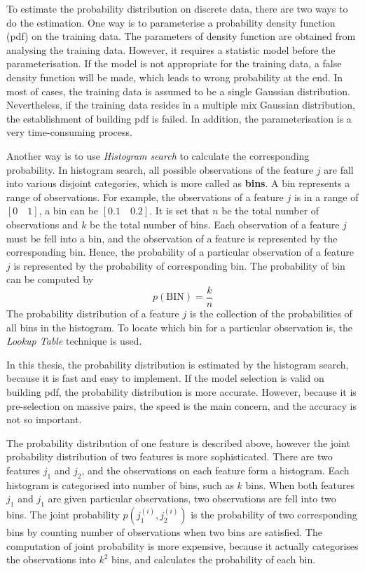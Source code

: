 To estimate the probability distribution on discrete data, there are two ways to do the estimation. One way is to parameterise a probability density function (pdf) on the training data. The parameters of density function are obtained from analysing the training data. However, it requires a statistic model before the parameterisation. If the model is not appropriate for the training data, a false density function will be made, which leads to wrong probability at the end. In most of cases, the training data is assumed to be a single Gaussian distribution. Nevertheless, if the training data resides in a multiple mix Gaussian distribution, the establishment of building pdf is failed. In addition, the parameterisation is a very time-consuming process. 

Another way is to use \textit{Histogram search} to calculate the corresponding probability. In histogram search, all possible observations of the feature $j$ are fall into various disjoint categories, which is more called as \textbf{bins}. A bin represents a range of observations. For example, the observations of a feature $j$ is in a range of $[0\quad 1]$, a bin can be $[0.1\quad 0.2]$. It is set that $n$ be the total number of observations and $k$ be the total number of bins. Each observation of a feature $j$ must be fell into a bin, and the observation of a feature is represented by the corresponding bin. Hence, the probability of a particular observation of a feature $j$ is represented by the probability of corresponding bin. The probability of bin can be computed by 
\begin{equation}
p(\mathrm{BIN}) = \frac{k}{n}
\end{equation}
The probability distribution of a feature $j$ is the collection of the probabilities of all bins in the histogram. To locate which bin for a particular observation is, the \textit{Lookup Table} \cite{wiki:LUT} technique is used.

In this thesis, the probability distribution is estimated by the histogram search, because it is fast and easy to implement. If the model selection is valid on building pdf, the probability distribution is more accurate. However, because it is pre-selection on massive pairs, the speed is the main concern, and the accuracy is not so important.

The probability distribution of one feature is described above, however the joint probability distribution of two features is more sophisticated. There are two features $j_1$ and $j_2$, and the observations on each feature form a histogram. Each histogram is categorised into number of bins, such as $k$ bins. When both features $j_1$ and $j_1$ are given particular observations, two observations are fell into two bins. The joint probability $p(j_1^{(i)},j_2^{(i)})$ is the probability of two corresponding bins by counting number of observations when two bins are satisfied. The computation of joint probability is more expensive, because it actually categorises the observations into $k^2$ bins, and calculates the probability of each bin. 



